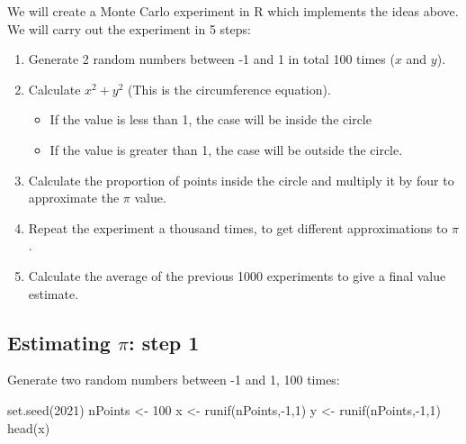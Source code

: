 \documentclass[
]{book}
\newenvironment{Shaded}{\begin{snugshade}}{\end{snugshade}}
\newcommand{\DecValTok}[1]{\textcolor[rgb]{0.00,0.00,0.81}{#1}}
\newcommand{\FunctionTok}[1]{\textcolor[rgb]{0.00,0.00,0.00}{#1}}
\newcommand{\NormalTok}[1]{#1}
\newcommand{\OtherTok}[1]{\textcolor[rgb]{0.56,0.35,0.01}{#1}}
\newcommand{\SpecialCharTok}[1]{\textcolor[rgb]{0.00,0.00,0.00}{#1}}
\providecommand{\tightlist}{%
  \setlength{\itemsep}{0pt}\setlength{\parskip}{0pt}}
\begin{document}
We will create a Monte Carlo experiment in R which implements the ideas above. We will carry out the experiment in 5 steps:

\begin{enumerate}
\def\labelenumi{\arabic{enumi}.}
\item
  Generate 2 random numbers between -1 and 1 in total 100 times (\(x\) and \(y\)).
\item
  Calculate \(x^2 + y^2\) (This is the circumference equation).

  \begin{itemize}
  \tightlist
  \item
    If the value is less than 1, the case will be inside the circle
  \item
    If the value is greater than 1, the case will be outside the circle.
  \end{itemize}
\item
  Calculate the proportion of points inside the circle and multiply it by four to approximate the \(\pi\) value.
\item
  Repeat the experiment a thousand times, to get different approximations to \(\pi\).
\item
  Calculate the average of the previous 1000 experiments to give a final value estimate.
\end{enumerate}

\hypertarget{estimating-pi-step-1}{%
\subsection{\texorpdfstring{Estimating \(\pi\): step 1}{Estimating \textbackslash pi: step 1}}\label{estimating-pi-step-1}}

Generate two random numbers between -1 and 1, 100 times:

\begin{Shaded}
\begin{Highlighting}[]
\FunctionTok{set.seed}\NormalTok{(}\DecValTok{2021}\NormalTok{)}
\NormalTok{nPoints }\OtherTok{\textless{}{-}} \DecValTok{100}
\NormalTok{x }\OtherTok{\textless{}{-}} \FunctionTok{runif}\NormalTok{(nPoints,}\SpecialCharTok{{-}}\DecValTok{1}\NormalTok{,}\DecValTok{1}\NormalTok{)}
\NormalTok{y }\OtherTok{\textless{}{-}} \FunctionTok{runif}\NormalTok{(nPoints,}\SpecialCharTok{{-}}\DecValTok{1}\NormalTok{,}\DecValTok{1}\NormalTok{)}
\FunctionTok{head}\NormalTok{(x)}
\end{Highlighting}
\end{Shaded}
\end{document}
